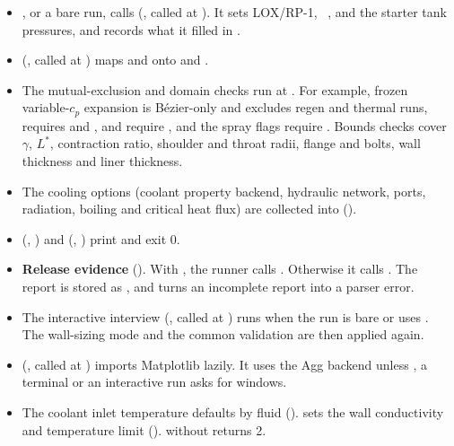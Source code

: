 \begin{itemize}
  \item {}, or a bare run, calls  (, called at ). It sets LOX/RP-1, ~,  and the starter tank pressures, and records what it filled in .
  \item {} (, called at ) maps  and  onto  and .
  \item The mutual-exclusion and domain checks run at . For example, frozen variable-$c_p$ expansion is B\'ezier-only and excludes regen and thermal runs,  requires  and ,  and  require , and the spray flags require . Bounds checks cover $\gamma$, $L^*$, contraction ratio, shoulder and throat radii, flange and bolts, wall thickness and liner thickness.
  \item The cooling options (coolant property backend, hydraulic network, ports, radiation, boiling and critical heat flux) are collected into  ().
  \item {} (, ) and  (, ) print and exit 0.
  \item \textbf{Release evidence} (). With , the runner calls . Otherwise it calls . The report is stored as , and  turns an incomplete report into a parser error.
  \item The interactive interview  (, called at ) runs when the run is bare or uses . The wall-sizing mode and the common validation are then applied again.
  \item {} (, called at ) imports Matplotlib lazily. It uses the Agg backend unless , a terminal or an interactive run asks for windows.
  \item The coolant inlet temperature defaults by fluid ().  sets the wall conductivity and temperature limit ().  without  returns 2.
\end{itemize}

